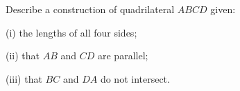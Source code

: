 Describe a construction of quadrilateral $ABCD$ given:

(i) the lengths of all four sides;

(ii) that $AB$ and $CD$ are parallel;

(iii) that $BC$ and $DA$ do not intersect.